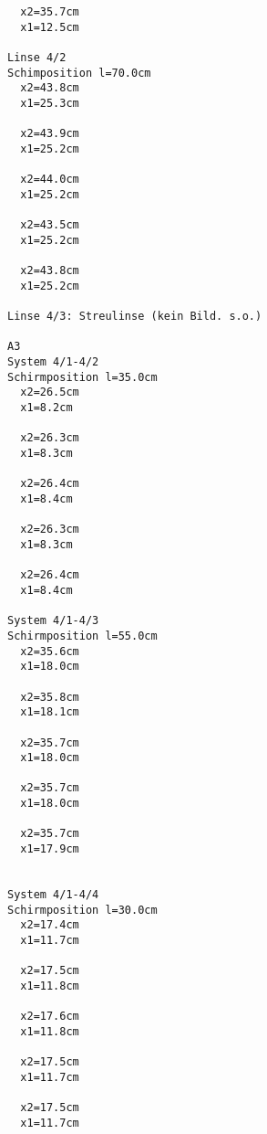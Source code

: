 \documentclass[12pt,a4paper,notitlepage]{article}
\begin{document}
\begin{verbatim}
  x2=35.7cm
  x1=12.5cm

Linse 4/2
Schimposition l=70.0cm
  x2=43.8cm
  x1=25.3cm

  x2=43.9cm
  x1=25.2cm

  x2=44.0cm
  x1=25.2cm

  x2=43.5cm
  x1=25.2cm

  x2=43.8cm
  x1=25.2cm

Linse 4/3: Streulinse (kein Bild. s.o.)

A3
System 4/1-4/2
Schirmposition l=35.0cm
  x2=26.5cm
  x1=8.2cm

  x2=26.3cm
  x1=8.3cm

  x2=26.4cm
  x1=8.4cm

  x2=26.3cm
  x1=8.3cm

  x2=26.4cm
  x1=8.4cm

System 4/1-4/3
Schirmposition l=55.0cm
  x2=35.6cm
  x1=18.0cm

  x2=35.8cm
  x1=18.1cm

  x2=35.7cm
  x1=18.0cm

  x2=35.7cm
  x1=18.0cm

  x2=35.7cm
  x1=17.9cm


System 4/1-4/4
Schirmposition l=30.0cm
  x2=17.4cm
  x1=11.7cm

  x2=17.5cm
  x1=11.8cm

  x2=17.6cm
  x1=11.8cm

  x2=17.5cm
  x1=11.7cm

  x2=17.5cm
  x1=11.7cm

\end{verbatim}
\end{document}
